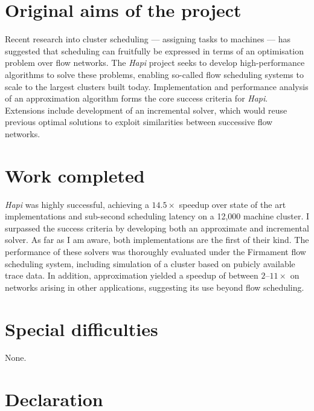 \documentclass[12pt,a4paper,twoside,notitlepage]{report}
\theoremstyle{plain}
\theoremstyle{definition}
\theoremstyle{remark}
\begin{document}
\renewcommand{\arraystretch}{1.3}
\vspace*{-1em}
\section*{Original aims of the project}

Recent research into cluster scheduling --- assigning tasks to machines --- has suggested that scheduling can fruitfully be expressed in terms of an optimisation problem over flow networks. The \emph{Hapi} project seeks to develop high-performance algorithms to solve these problems, enabling so-called flow scheduling systems to scale to the largest clusters built today. Implementation and performance analysis of an approximation algorithm forms the core success criteria for \emph{Hapi}. Extensions include development of an incremental solver, which would reuse previous optimal solutions to exploit similarities between successive flow networks.

\vspace*{-1em}
\section*{Work completed}

\emph{Hapi} was highly successful, achieving a $14.5\times$ speedup over state of the art implementations and sub-second scheduling latency on a 12,000 machine cluster. I surpassed the success criteria by developing both an approximate and incremental solver. As far as I am aware, both implementations are the first of their kind. The performance of these solvers was thoroughly evaluated under the Firmament flow scheduling system, including simulation of a cluster based on pubicly available trace data. In addition, approximation yielded a speedup of between $2\text{--}11\times$ on networks arising in other applications, suggesting its use beyond flow scheduling.

\vspace*{-1em}
\section*{Special difficulties}

None.

\newpage

\section*{Declaration}
\end{document}
